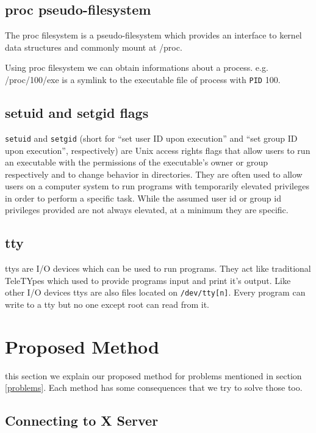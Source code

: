 \documentclass[journal]{IEEEtran}
\begin{document}
\subsection{proc pseudo-filesystem}

The proc filesystem is a pseudo-filesystem which provides an interface to kernel data structures and commonly mount at /proc. \cite{linuxman:proc}

Using proc filesystem we can obtain informations about a process. e.g. /proc/100/exe is a symlink to the executable file of process with \texttt{PID} 100.

\subsection{setuid and setgid flags}

\texttt{setuid} and \texttt{setgid} (short for ``set user ID upon execution'' and ``set group ID upon execution'', respectively) are Unix access rights flags that allow users to run an executable with the permissions of the executable's owner or group respectively and to change behavior in directories. They are often used to allow users on a computer system to run programs with temporarily elevated privileges in order to perform a specific task. While the assumed user id or group id privileges provided are not always elevated, at a minimum they are specific. \cite{wiki:setuidgid}

\subsection{tty}

ttys are I/O devices which can be used to run programs. They act like traditional TeleTYpes which used to provide programs input and print it's output. Like other I/O devices ttys are also files located on \texttt{/dev/tty[n]}. Every program can write to a tty but no one except root can read from it. 

\section{Proposed Method}

 this section we explain our proposed method for problems mentioned in section \ref{problems}. Each method has some consequences that we try to solve those too.

\subsection{Connecting to X Server}
\end{document}
